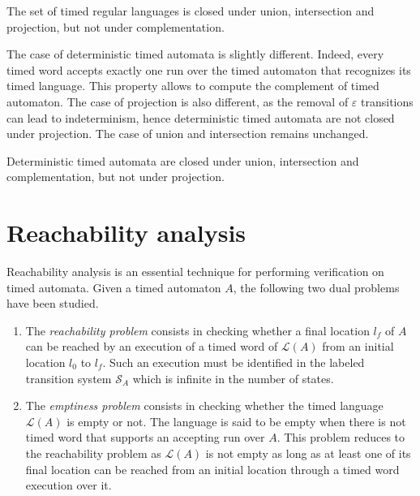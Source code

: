 \begin{theorem} \cite{RADLD94,RA98}
  
The set of timed regular languages is closed under union, intersection and projection, but not under complementation.

\end{theorem}

The case of deterministic timed automata is slightly different. Indeed, every timed word accepts exactly one run over the timed automaton that recognizes its timed language. This property allows to compute the complement of timed automaton. The case of projection is also different, as the removal of $\varepsilon$ transitions can lead to indeterminism, hence deterministic timed automata are not closed under projection. The case of union and intersection remains unchanged.

\begin{theorem} \cite{RADLD94,RA98}
  
Deterministic timed automata are closed under union, intersection and complementation, but not under projection.

\end{theorem}


\section{Reachability analysis}


Reachability analysis is an essential technique for performing verification on timed automata. Given a timed automaton $A$, the following two dual problems have been studied.
\begin{enumerate}

	\item The \emph{reachability problem} consists in checking whether a final location $l_f$ of $A$ can be reached by an execution of a timed word of $\mathcal{L}(A)$ from an initial location $l_0$ to $l_f$. Such an execution must be identified in the labeled transition system $\mathcal{S}_A$ which is infinite in the number of states.

	\item The \emph{emptiness problem} consists in checking whether the timed language $\mathcal{L}(A)$ is empty or not. The language is said to be empty when there is not timed word that supports an accepting run over $A$. This problem reduces to the reachability problem as $\mathcal{L}(A)$ is not empty as long as at least one of its final location can be reached from an initial location through a timed word execution over it.

\end{enumerate}

